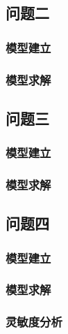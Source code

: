 \documentclass{../../../Template/cumcmthesis-2025} %
\begin{document}
\subsection{问题二}

\subsubsection{模型建立}



\subsubsection{模型求解}



\subsection{问题三}

\subsubsection{模型建立}



\subsubsection{模型求解}


\subsection{问题四}

\subsubsection{模型建立}



\subsubsection{模型求解}


\subsubsection{灵敏度分析}

\end{document}
